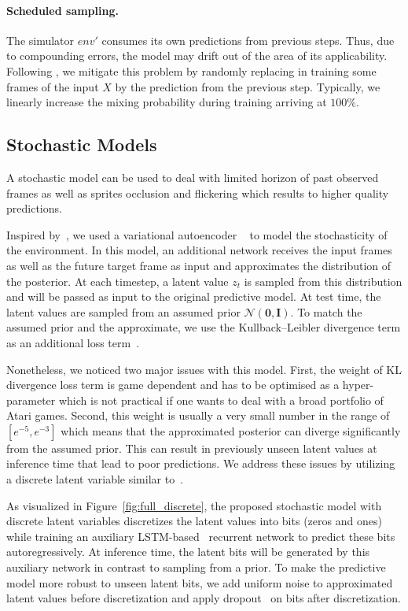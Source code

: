\paragraph{Scheduled sampling.}
The simulator $env'$ consumes its own predictions from previous steps. Thus, due to compounding errors, the model may drift out of the area of its applicability. Following \cite{BengioVJS15,venkatraman}, we mitigate this problem by randomly replacing in training some frames of the input $X$ by the prediction from the previous step. Typically, we linearly increase the mixing probability during training arriving at $100\%$.

\subsection{Stochastic Models}
A stochastic model can be used to deal with limited horizon of past observed frames as well as sprites occlusion and flickering which results to higher quality predictions. 


Inspired by~\citet{sv2p}, we used a variational autoencoder ~\citep{kingma2013auto} to model the stochasticity of the environment. In this model, an additional network receives the input frames as well as the future target frame as input and approximates the distribution of the posterior. At each timestep, a latent value $z_t$ is sampled from this distribution and will be passed as input to the original predictive model. At test time, the latent values are sampled from an assumed prior 
$\mathcal{N}(\mathbf{0}, \mathbf{I})$. 
To match the assumed prior and the approximate, we use the Kullback–Leibler divergence term as an additional loss term~\citep{sv2p}.


Nonetheless, we noticed two major issues with this model. First, the weight of KL divergence loss term is game dependent and has to be optimised as a hyper-parameter which is not practical if one wants to deal with a broad portfolio of Atari games. Second, this weight is usually a very small number in the range of $[e^{-5}, e^{-3}]$ which means that the approximated posterior can diverge significantly from the assumed prior. This can result in previously unseen latent values at inference time that lead to poor predictions. We address these issues by utilizing a discrete latent variable similar to~\citet{auto_discrete}. 

As visualized in Figure~\ref{fig:full_discrete}, the proposed stochastic model with discrete latent variables discretizes the latent values into bits (zeros and ones) while training an auxiliary LSTM-based~\cite{hochreiter1997long} recurrent network to predict these bits autoregressively. At inference time, the latent bits will be generated by this auxiliary network in contrast to sampling from a prior. To make the predictive model more robust to unseen latent bits, we add uniform noise to approximated latent values before discretization and apply dropout~\cite{srivastava2014dropout} on bits after discretization.


